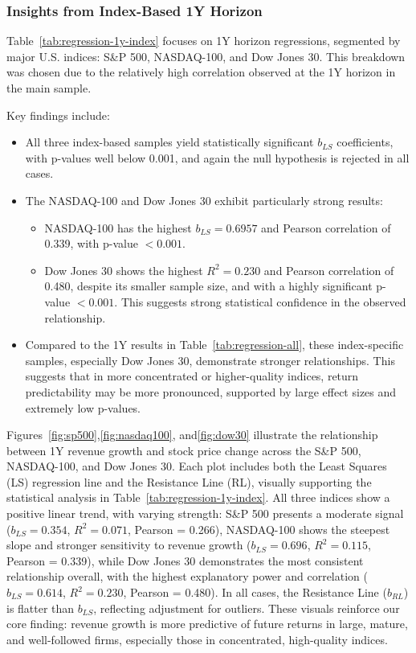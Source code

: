 \documentclass[11pt]{article}
\begin{document}
\subsubsection{Insights from Index-Based 1Y Horizon}

Table~\ref{tab:regression-1y-index} focuses on 1Y horizon regressions, segmented by major U.S. indices: S\&P 500, NASDAQ-100, and Dow Jones 30. This breakdown was chosen due to the relatively high correlation observed at the 1Y horizon in the main sample.

Key findings include:

\begin{itemize}
    \item All three index-based samples yield statistically significant $b_{LS}$ coefficients, with p-values well below 0.001, and again the null hypothesis is rejected in all cases.

    \item The NASDAQ-100 and Dow Jones 30 exhibit particularly strong results:
        \begin{itemize}
            \item NASDAQ-100 has the highest $b_{LS} = 0.6957$ and Pearson correlation of 0.339, with p-value $<0.001$.
            \item Dow Jones 30 shows the highest $R^2 = 0.230$ and Pearson correlation of 0.480, despite its smaller sample size, and with a highly significant p-value $<0.001$. This suggests strong statistical confidence in the observed relationship.
        \end{itemize}

    \item Compared to the 1Y results in Table~\ref{tab:regression-all}, these index-specific samples, especially Dow Jones 30, demonstrate stronger relationships. This suggests that in more concentrated or higher-quality indices, return predictability may be more pronounced, supported by large effect sizes and extremely low p-values.
\end{itemize}

Figures~\ref{fig:sp500},\ref{fig:nasdaq100}, and\ref{fig:dow30} illustrate the relationship between 1Y revenue growth and stock price change across the S\&P 500, NASDAQ-100, and Dow Jones 30. Each plot includes both the Least Squares (LS) regression line and the Resistance Line (RL), visually supporting the statistical analysis in Table~\ref{tab:regression-1y-index}. All three indices show a positive linear trend, with varying strength: S\&P 500 presents a moderate signal ($b_{LS}=0.354$, $R^2=0.071$, Pearson = 0.266), NASDAQ-100 shows the steepest slope and stronger sensitivity to revenue growth ($b_{LS}=0.696$, $R^2=0.115$, Pearson = 0.339), while Dow Jones 30 demonstrates the most consistent relationship overall, with the highest explanatory power and correlation ($b_{LS}=0.614$, $R^2=0.230$, Pearson = 0.480). In all cases, the Resistance Line ($b_{RL}$) is flatter than $b_{LS}$, reflecting adjustment for outliers. These visuals reinforce our core finding: revenue growth is more predictive of future returns in large, mature, and well-followed firms, especially those in concentrated, high-quality indices.
\end{document}
